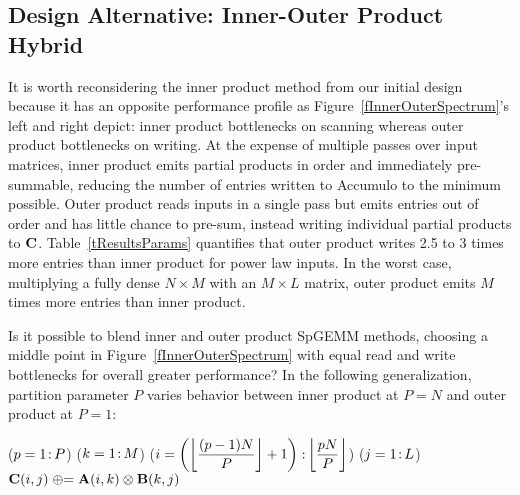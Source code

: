 \subsection{Design Alternative: Inner-Outer Product Hybrid}

It is worth reconsidering the inner product method from our initial design
because it has an opposite performance profile as 
Figure~\ref{fInnerOuterSpectrum}'s left and right depict: 
inner product bottlenecks on scanning whereas outer product bottlenecks on writing.
At the expense of multiple passes over input matrices, inner product emits 
partial products in order and immediately pre-summable,
reducing the number of entries written to Accumulo to the minimum possible.
Outer product reads inputs in a single pass
but emits entries out of order and has little chance to pre-sum, 
instead writing individual partial products to $\mathbf{C}$.
Table~\ref{tResultsParams} quantifies that outer product writes
2.5 to 3 times more entries than inner product for power law inputs.
In the worst case, multiplying a fully dense $N \times M$ with an $M \times L$ matrix,
outer product emits $M$ times more entries than inner product.



Is it possible to blend inner and outer product SpGEMM methods,
choosing a middle point in Figure~\ref{fInnerOuterSpectrum}
with equal read and write bottlenecks for overall greater performance?
In %
the following generalization, 
partition parameter $P$ varies behavior between
inner product at $P=N$ and outer product at $P=1$:

\removelatexerror
\begin{algorithm}[H]
\vspace{\algspace}
\fore($p = 1\colon\! P$){
\fore($k = 1\colon\! M$){
\fore({$i = \left( \floor*{\dfrac{(p-1)N}{P}}+1 \right) \col \floor*{\dfrac{p N}{P}}$}){
\fore($j = 1\colon\! L$){
{$\mathbf{C}(i,j) \mathrel{\oplus}= \mathbf{A}(i,k) \otimes \mathbf{B}(k,j)$}
}}}}
\vspace{\algspace}
\end{algorithm}

